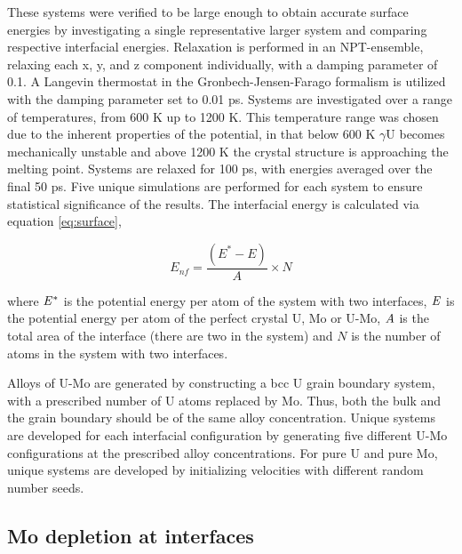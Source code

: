 \documentclass[review]{elsarticle}
\providecommand{\DIFaddtex}[1]{{\protect\color{blue} \sf #1}} %
\providecommand{\DIFaddbegin}{} %
\providecommand{\DIFaddend}{} %
\providecommand{\DIFadd}[1]{\texorpdfstring{\DIFaddtex{#1}}{#1}} %
\newcommand{\DIFaddincludegraphics}[2][]{{\color{blue}\fbox{\DIFOincludegraphics[#1]{#2}}}} %
\DeclareRobustCommand{\DIFaddbegin}{\DIFOaddbegin \let\includegraphics\DIFaddincludegraphics} %
\DeclareRobustCommand{\DIFaddend}{\DIFOaddend \let\includegraphics\DIFOincludegraphics} %
\begin{document}
These systems were verified to be large enough to obtain accurate surface energies by investigating a single representative larger system and comparing respective interfacial energies. Relaxation is performed in an NPT-ensemble, relaxing each x, y, and z component individually, with a damping parameter of 0.1. A Langevin thermostat in the Gronbech-Jensen-Farago \cite{gjf2014} formalism is utilized with the damping parameter set to 0.01 ps. Systems are \DIFaddbegin \DIFadd{investigated over a range of temperatures, from 600 K up to 1200 K. This temperature range was chosen due to the inherent properties of the potential, in that below 600 K $\gamma$U becomes mechanically unstable and above 1200 K the crystal structure is approaching the melting point. Systems are }\DIFaddend relaxed for 100 ps, with energies averaged over the final 50 ps. Five unique simulations are performed for each system to ensure statistical significance of the results. The interfacial energy is calculated via equation \ref{eq:surface},

\begin{equation}
\label{eq:surface}
E_{nf}= \frac{(E^{*} - E)}{A} \times N
\end{equation}

where $\it{E^{*}}$ is the \DIFaddbegin \DIFadd{potential }\DIFaddend energy per atom of the system with two interfaces, $\it{E}$ is the \DIFaddbegin \DIFadd{potential }\DIFaddend energy per atom of the perfect crystal U, Mo or U-Mo, $\it{A}$ is the total area of the interface (there are two in the system) and $\textit{N}$ is the number of atoms in the system with two interfaces. 

Alloys of U-Mo are generated by constructing a bcc U grain boundary system, with a prescribed number of U atoms replaced by Mo. Thus, both the bulk and the grain boundary should be of the same alloy concentration. Unique systems are developed for each interfacial configuration by generating five different U-Mo configurations at the prescribed alloy concentrations. For pure U and pure Mo, unique systems are developed by initializing velocities with different random number seeds. 

\subsection{Mo depletion at interfaces}
\end{document}
